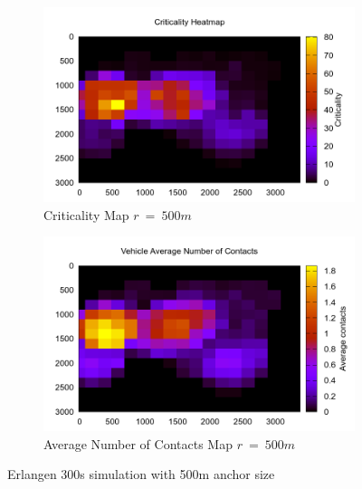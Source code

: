 \begin{figure}[h]
	\centering
	\begin{subfigure}[t]{0.5\textwidth}
 		\includegraphics[width=\textwidth]{img/Erlangen/criticality3_sim_Erlangen_300s_500m}
 		\caption{Criticality Map $r\ =\ 500m$}
 		\label{fig:Erlangen_criticality_300s_500m}
 	\end{subfigure}%
 	\hfill
 	\begin{subfigure}[t]{0.5\textwidth}
 		\includegraphics[width=\textwidth]{img/Erlangen/avgContacts_sim_Erlangen_300s_500m}
 		\caption{Average Number of Contacts Map $r\ =\ 500m$}
 		\label{fig:Erlangen_avg_300s_500m}
 	\end{subfigure}
 	\caption{Erlangen 300s simulation with 500m anchor size}
 	\label{fig:Erlangen_300s_500m}
\end{figure}


